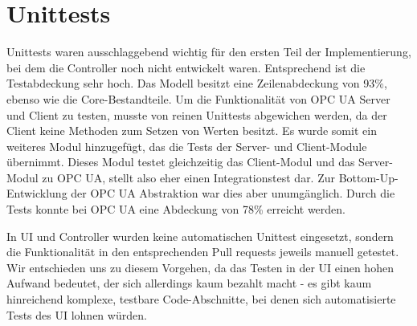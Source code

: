 \documentclass[parskip=full]{scrartcl}
\begin{document}
\section{Unittests}
Unittests waren ausschlaggebend wichtig für den ersten Teil der Implementierung, bei dem die Controller noch nicht entwickelt waren.
Entsprechend ist die Testabdeckung sehr hoch. Das Modell besitzt eine Zeilenabdeckung von 93\%, ebenso wie die Core-Bestandteile.
Um die Funktionalität von OPC UA Server und Client zu testen, musste von reinen Unittests abgewichen werden, da der Client keine
Methoden zum Setzen von Werten besitzt. Es wurde somit ein weiteres Modul hinzugefügt, das die Tests der Server- und Client-Module übernimmt.
Dieses Modul testet gleichzeitig das Client-Modul und das Server-Modul zu OPC UA, stellt also eher einen Integrationstest dar. Zur Bottom-Up-Entwicklung der OPC UA Abstraktion war dies aber unumgänglich. Durch die Tests konnte bei OPC UA eine Abdeckung von 78\% erreicht werden.

In UI und Controller wurden keine automatischen Unittest eingesetzt, sondern die Funktionalität in den entsprechenden Pull requests
jeweils manuell getestet. Wir entschieden uns zu diesem Vorgehen, da das Testen in der UI einen hohen Aufwand bedeutet, der sich allerdings
kaum bezahlt macht - es gibt kaum hinreichend komplexe, testbare Code-Abschnitte, bei denen sich automatisierte Tests des UI lohnen würden.

\pagebreak
{}
{}
\listoffigures
\end{document}
